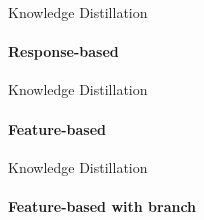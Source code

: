 \documentclass[compress,aspectratio=169,xcolor=table]{beamer}
\begin{document}
\begin{frame}{Knowledge Distillation}
	\framesubtitle{Response-based}
	\begin{figure}
	\end{figure}
\end{frame}


\begin{frame}{Knowledge Distillation}
	\framesubtitle{Feature-based}
	\begin{figure}
	\end{figure}
\end{frame}


\begin{frame}{Knowledge Distillation}
	\framesubtitle{Feature-based with branch}
	\begin{figure}
	\end{figure}
\end{frame}
\end{document}

